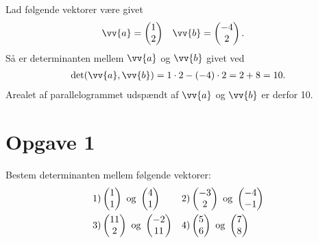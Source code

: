 \begin{exa}
	Lad følgende vektorer være givet
	\begin{align*}
		&\vv{a} = 
		\begin{pmatrix}
			1 \\ 2
		\end{pmatrix}
		&&\vv{b} = 
		\begin{pmatrix}
			-4 \\ 2
		\end{pmatrix}.
	\end{align*}
	Så er determinanten mellem $\vv{a}$ og $\vv{b}$ givet ved
	\begin{align*}
		\det(\vv{a},\vv{b}) = 1\cdot2 -(-4)\cdot 2 = 2+8 = 10. 
	\end{align*}
	Arealet af parallelogrammet udspændt af $\vv{a}$ og $\vv{b}$ er derfor 10. 
\end{exa}


\section*{Opgave 1}
Bestem determinanten mellem følgende vektorer:
\begin{align*}
	&1)\begin{pmatrix}1 \\ 1\end{pmatrix} \textnormal{ og } \begin{pmatrix}4 \\ 1\end{pmatrix} 		&&2)\begin{pmatrix}-3 \\ 2\end{pmatrix} \textnormal{ og } \begin{pmatrix}-4 \\ -1\end{pmatrix}   	\\
	&3)\begin{pmatrix}11 \\ 2\end{pmatrix} \textnormal{ og } \begin{pmatrix}-2 \\ 11\end{pmatrix} 		&&4)\begin{pmatrix} 5 \\ 6\end{pmatrix} \textnormal{ og } \begin{pmatrix}7 \\ 8\end{pmatrix}   	\\
\end{align*}


